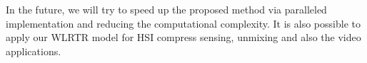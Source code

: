 \documentclass[twocolumn]{svjour3}          %
\begin{document}
    In the future, we will try to speed up the proposed method via paralleled implementation and reducing the computational complexity. It is also possible to apply our WLRTR model for HSI compress sensing, unmixing and also the video applications.


{\footnotesize

}
\end{document}
